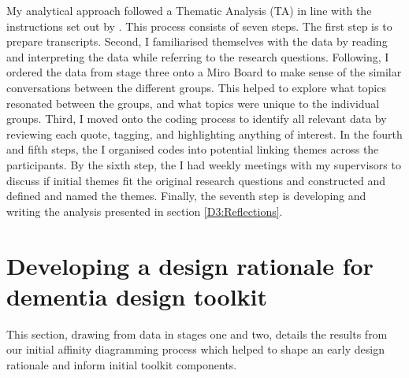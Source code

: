 My analytical approach followed a Thematic Analysis (TA) in line with the instructions set out by  \cite{braun_using_2006,braun_one_2020}. This process consists of seven steps. The first step is to prepare transcripts. Second,  I familiarised themselves with the data by reading and interpreting the data while referring to the research questions. Following, I ordered the data from stage three onto a Miro Board to make sense of the similar conversations between the different groups. This helped to explore what topics resonated between the groups, and what topics were unique to the individual groups. Third, I moved onto the coding process to identify all relevant data by reviewing each quote, tagging, and highlighting anything of interest. In the fourth and fifth steps, the I organised codes into potential linking themes across the participants. By the sixth step, the I had weekly meetings with my supervisors to discuss if initial themes fit the original research questions and constructed and defined and named the themes. Finally, the seventh step is developing and writing the analysis presented in section \ref{D3:Reflections}.

\section{Developing a design rationale for dementia design toolkit}
\label{D3:Rationale}
This section, drawing from data in stages one and two, details the results from our initial affinity diagramming process which helped to shape an early design rationale and inform initial toolkit components.

